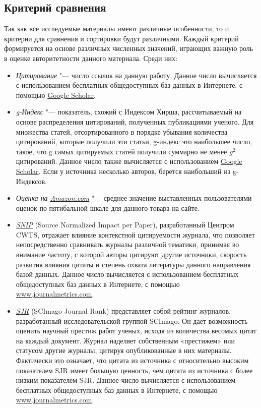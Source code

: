 \documentclass{article}
\begin{document}
	\subsection{Критерий сравнения}
	Так как все исследуемые материалы имеют различные особенности, то и критерии для сравнения и сортировки будут различными. Каждый критерий формируется на основе различных численных значений, играющих важную роль в оценке авторитетности данного материала. Среди них:
	\begin{itemize}
		\item \textit{Цитирование} "--- число ссылок на данную работу. Данное число вычисляется с использованием бесплатных общедоступных баз данных в Интернете, с помощью \href{http://scholar.google.ru/schhp?hl=ru&as_sdt=0,5}{Google Scholar}.
		\item \textit{g-Индекс} "--- показатель, схожий с Индексом Хирша, рассчитываемый на основе распределения цитирований, полученных публикациями ученого. Для множества статей, отсортированного в порядке убывания количества цитирований, которые получили эти статьи, g-индекс это наибольшее число, такое, что g самых цитируемых статей получили суммарно не менее $g^2$ цитирований. Данное число также вычисляется с использованием \href{http://scholar.google.ru/schhp?hl=ru&as_sdt=0,5}{Google Scholar}. Если у источника несколько авторов, берется наибольший из g-Индексов.
		\item \textit{Оценка на \href{http://www.amazon.com/}{Amazon.com}} "--- среднее значение выставленных пользователями оценок по пятибальной шкале для данного товара на сайте. 
		\item \textit{\href{http://arxiv.org/abs/0911.2632}{SNIP}} (Source Normalized Impact per Paper), разработанный Центром CWTS, отражает влияние контекстной цитируемости журнала, что позволяет непосредственно сравнивать журналы различной тематики, принимая во внимание частоту, с которой авторы цитируют другие источники, скорость развития влияния цитаты и степень охвата литературы данного направления базой данных. Данное число вычисляется с использованием бесплатных общедоступных баз данных в Интернете, с помощью \href{http://www.journalmetrics.com/}{www.journalmetrics.com}.
		\item \textit{\href{http://arxiv.org/abs/0912.4141}{SJR}} (SCImago Journal Rank) представляет собой рейтинг журналов, разработанный исследовательской группой SCImago. Он дает возможность оценить научный престиж работ ученых, исходя из количества весомых цитат на каждый документ. Журнал наделяет собственным «престижем» или статусом другие журналы, цитируя опубликованные в них материалы. Фактически это означает, что цитата из источника с относительно высоким показателем SJR имеет большую ценность, чем цитата из источника с более низким показателем SJR. Данное число вычисляется с использованием бесплатных общедоступных баз данных в Интернете, с помощью \href{http://www.journalmetrics.com/}{www.journalmetrics.com}.
	\end{itemize}
	
\end{document}

